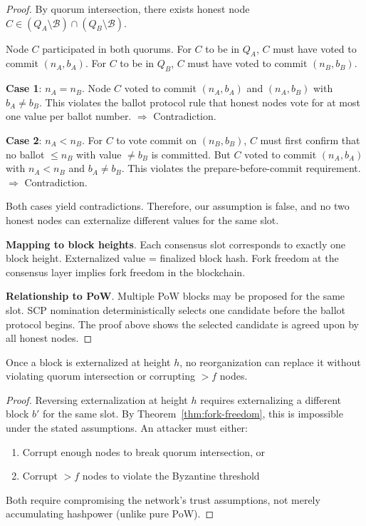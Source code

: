 \begin{proof}
By quorum intersection, there exists honest node $C \in (Q_A \setminus \mathcal{B}) \cap (Q_B \setminus \mathcal{B})$.

Node $C$ participated in both quorums. For $C$ to be in $Q_A$, $C$ must
have voted to commit $(n_A, b_A)$. For $C$ to be in $Q_B$, $C$ must have
voted to commit $(n_B, b_B)$.

\textbf{Case 1}: $n_A = n_B$. Node $C$ voted to commit $(n_A, b_A)$ and
$(n_A, b_B)$ with $b_A \neq b_B$. This violates the ballot protocol rule
that honest nodes vote for at most one value per ballot number.
$\Rightarrow$ Contradiction.

\textbf{Case 2}: $n_A < n_B$. For $C$ to vote commit on $(n_B, b_B)$, $C$
must first confirm that no ballot $\leq n_B$ with value $\neq b_B$ is
committed. But $C$ voted to commit $(n_A, b_A)$ with $n_A < n_B$ and
$b_A \neq b_B$. This violates the prepare-before-commit requirement.
$\Rightarrow$ Contradiction.

Both cases yield contradictions. Therefore, our assumption is false,
and no two honest nodes can externalize different values for the same slot.

\textbf{Mapping to block heights}. Each consensus slot corresponds to
exactly one block height. Externalized value = finalized block hash.
Fork freedom at the consensus layer implies fork freedom in the blockchain.

\textbf{Relationship to PoW}. Multiple PoW blocks may be proposed for the
same slot. SCP nomination deterministically selects one candidate before
the ballot protocol begins. The proof above shows the selected candidate
is agreed upon by all honest nodes.
\end{proof}

\begin{corollary}
Once a block is externalized at height $h$, no reorganization can replace
it without violating quorum intersection or corrupting $> f$ nodes.
\end{corollary}

\begin{proof}
Reversing externalization at height $h$ requires externalizing a different
block $b'$ for the same slot. By Theorem~\ref{thm:fork-freedom}, this is
impossible under the stated assumptions. An attacker must either:
\begin{enumerate}
  \item Corrupt enough nodes to break quorum intersection, or
  \item Corrupt $> f$ nodes to violate the Byzantine threshold
\end{enumerate}
Both require compromising the network's trust assumptions, not merely
accumulating hashpower (unlike pure PoW).
\end{proof}

